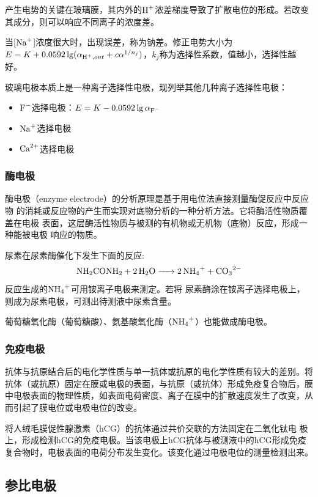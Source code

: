 产生电势的关键在玻璃膜，其内外的$\ce{H+}$浓差梯度导致了扩散电位的形成。若改变其成分，则可以响应不同离子的浓度差。

当[$\ce{Na+}$]浓度很大时，出现误差，称为钠差。修正电势大小为$E=K+0.0592\lg ( {\alpha_{\ce{H+},out}}+c\alpha^{1/n_j})$，$k_j$称为选择性系数，值越小，选择性越好。

玻璃电极本质上是一种离子选择性电极，现列举其他几种离子选择性电极：
\begin{itemize}
	\item $\ce{F-}$选择电极：$E=K-0.0592\lg {\alpha_{\ce{F-}}}$
	\item $\ce{Na+}$选择电极
	\item $\ce{Ca^2+}$选择电极
\end{itemize}

\subsubsection{酶电极}
酶电极（enzyme electrode）的分析原理是基于用电位法直接测量酶促反应中反应物
的消耗或反应物的产生而实现对底物分析的一种分析方法。它将酶活性物质覆盖在电极
表面，这层酶活性物质与被测的有机物或无机物（底物）反应，形成一种能被电极
响应的物质。
\begin{example}
	尿素在尿素酶催化下发生下面的反应:
	$$\ce{NH2CONH2 + 2H2O -> 2NH4+ + CO3^2-}$$
	反应生成的$\ce{NH4+}$可用铵离子电极来测定。若将
	尿素酶涂在铵离子选择电极上，则成为尿素电极，可测出待测液中尿素含量。
	
	葡萄糖氧化酶（葡萄糖酸）、氨基酸氧化酶（$\ce{NH4+}$）也能做成酶电极。
\end{example}

\subsubsection{免疫电极}
抗体与抗原结合后的电化学性质与单一抗体或抗原的电化学性质有较大的差别。将抗体（或抗原）固定在膜或电极的表面，与抗原（或抗体）形成免疫复合物后，膜中电极表面的物理性质，如表面电荷密度、离子在膜中的扩散速度发生了改变，从而引起了膜电位或电极电位的改变。
\begin{example}
	将人绒毛膜促性腺激素（hCG）的抗体通过共价交联的方法固定在二氧化钛电
	极上，形成检测hCG的免疫电极。当该电极上hCG抗体与被测液中的hCG形成免疫复合物时，电极表面的电荷分布发生变化。该变化通过电极电位的测量检测出来。
\end{example}


\subsection{参比电极}

